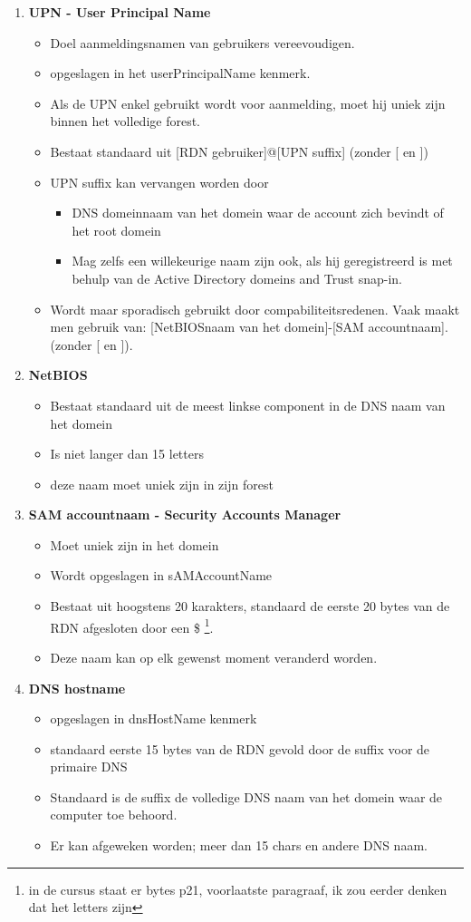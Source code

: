 \begin{enumerate}
\item \textbf{UPN - User Principal Name}
\begin{itemize}
\item Doel aanmeldingsnamen van gebruikers vereevoudigen.
\item opgeslagen in het userPrincipalName kenmerk.
\item Als de UPN enkel gebruikt wordt voor aanmelding, moet hij uniek zijn binnen het volledige forest.
\item Bestaat standaard uit [RDN gebruiker]@[UPN suffix] (zonder [ en ])
\item UPN suffix kan vervangen worden door
\begin{itemize}
\item DNS domeinnaam van het domein waar de account zich bevindt of het root domein
\item Mag zelfs een willekeurige naam zijn ook, als hij geregistreerd is met behulp van de Active Directory domeins and Trust snap-in.
\end{itemize}
\item Wordt maar sporadisch gebruikt door compabiliteitsredenen. Vaak maakt men gebruik van: [NetBIOSnaam van het domein]-[SAM accountnaam]. (zonder [ en ]).
\end{itemize}

\item \textbf{NetBIOS}
\begin{itemize}
\item Bestaat standaard uit de meest linkse component in de DNS naam van het domein
\item Is niet langer dan 15 letters
\item deze naam moet uniek zijn in zijn forest
\end{itemize}

\item \textbf{SAM accountnaam - Security Accounts Manager}
\begin{itemize}
\item Moet uniek zijn in het domein
\item Wordt opgeslagen in sAMAccountName
\item Bestaat uit hoogstens 20 karakters, standaard de eerste 20 bytes van de RDN afgesloten door een \$
\footnote{in de cursus staat er bytes p21, voorlaatste paragraaf, ik zou eerder denken dat het letters zijn}.
\item Deze naam kan op elk gewenst moment veranderd worden.
\end{itemize}
\clearpage
\item \textbf{DNS hostname}
\begin{itemize}
\item opgeslagen in dnsHostName kenmerk
\item standaard eerste 15 bytes van de RDN gevold door de suffix voor de primaire DNS
\item Standaard is de suffix de volledige DNS naam van het domein waar de computer toe behoord.
\item Er kan afgeweken worden; meer dan 15 chars en andere DNS naam.
\end{itemize}

\end{enumerate}

